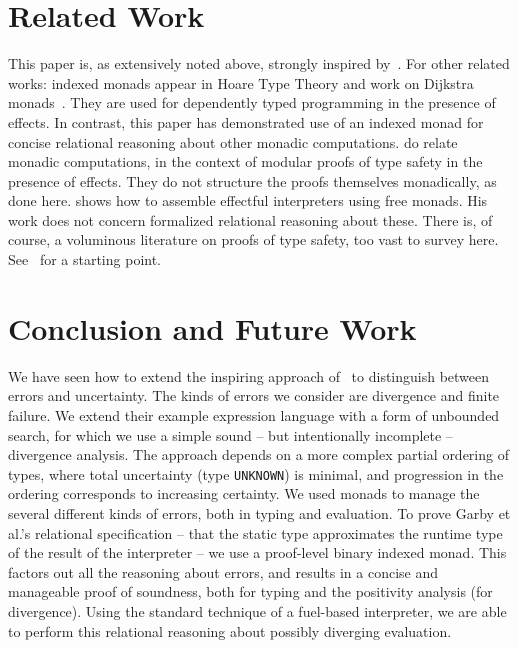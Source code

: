 \documentclass[acmsmall,screen,review]{acmart}
\begin{document}
\section{Related Work}

This paper is, as extensively noted above, strongly inspired
by~\citet{garby+25}.  For other related works: indexed monads appear
in Hoare Type Theory and work on Dijkstra
monads~\cite{nanevski+08,swamy+13}.  They are used for dependently
typed programming in the presence of effects.  In contrast, this paper
has demonstrated use of an indexed monad for concise relational
reasoning about other monadic computations.  \citet{delaware+13} do
relate monadic computations, in the context of modular proofs of type
safety in the presence of effects.  They do not structure the proofs
themselves monadically, as done here.  \citet{swierstra08} shows how
to assemble effectful interpreters using free monads.  His work does
not concern formalized relational reasoning about these.  There is, of
course, a voluminous literature on proofs of type safety, too vast to
survey here.  See~\citet{pierce02} for a starting point.

\section{Conclusion and Future Work}

We have seen how to extend the inspiring approach of~\citet{garby+25}
to distinguish between errors and uncertainty.  The kinds of errors we
consider are divergence and finite failure.  We extend their example
expression language with a form of unbounded search, for which we use
a simple sound -- but intentionally incomplete -- divergence analysis.
The approach depends on a more complex partial ordering of types,
where total uncertainty (type \verb|UNKNOWN|) is minimal, and
progression in the ordering corresponds to increasing certainty.  We
used monads to manage the several different kinds of errors, both in
typing and evaluation.  To prove Garby et al.'s relational
specification -- that the static type approximates the runtime type of
the result of the interpreter -- we use a proof-level binary indexed
monad.  This factors out all the reasoning about errors, and results
in a concise and manageable proof of soundness, both for typing and
the positivity analysis (for divergence).  Using the standard
technique of a fuel-based interpreter, we are able to perform this
relational reasoning about possibly diverging evaluation.
\end{document}
